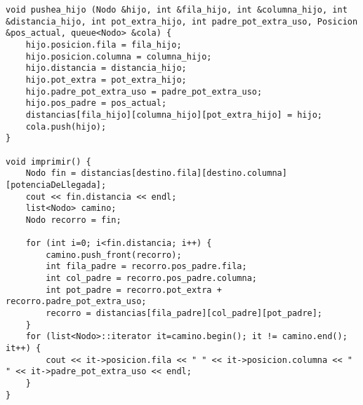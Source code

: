 \documentclass[11pt, a4paper, twoside]{article}
\begin{document}
\begin{lstlisting}
void pushea_hijo (Nodo &hijo, int &fila_hijo, int &columna_hijo, int &distancia_hijo, int pot_extra_hijo, int padre_pot_extra_uso, Posicion &pos_actual, queue<Nodo> &cola) {
    hijo.posicion.fila = fila_hijo;
    hijo.posicion.columna = columna_hijo;
    hijo.distancia = distancia_hijo;
    hijo.pot_extra = pot_extra_hijo;
    hijo.padre_pot_extra_uso = padre_pot_extra_uso;
    hijo.pos_padre = pos_actual;
    distancias[fila_hijo][columna_hijo][pot_extra_hijo] = hijo;
    cola.push(hijo);
}

void imprimir() {
    Nodo fin = distancias[destino.fila][destino.columna][potenciaDeLlegada];
    cout << fin.distancia << endl;
    list<Nodo> camino;
    Nodo recorro = fin;

    for (int i=0; i<fin.distancia; i++) {
        camino.push_front(recorro);
        int fila_padre = recorro.pos_padre.fila;
        int col_padre = recorro.pos_padre.columna;
        int pot_padre = recorro.pot_extra + recorro.padre_pot_extra_uso;
        recorro = distancias[fila_padre][col_padre][pot_padre];
    }
    for (list<Nodo>::iterator it=camino.begin(); it != camino.end(); it++) {
        cout << it->posicion.fila << " " << it->posicion.columna << " " << it->padre_pot_extra_uso << endl;
    }
}

   \end{lstlisting}

\end{document}
